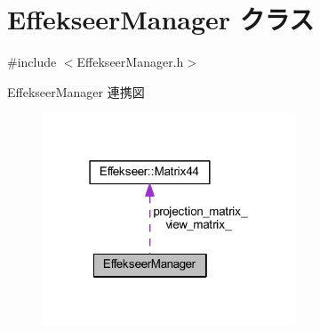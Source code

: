 \hypertarget{class_effekseer_manager}{}\section{Effekseer\+Manager クラス}
\label{class_effekseer_manager}


{\ttfamily \#include $<$Effekseer\+Manager.\+h$>$}



Effekseer\+Manager 連携図\nopagebreak
\begin{figure}[H]
\begin{center}
\leavevmode
\includegraphics[width=214pt]{class_effekseer_manager__coll__graph}
\end{center}
\end{figure}
